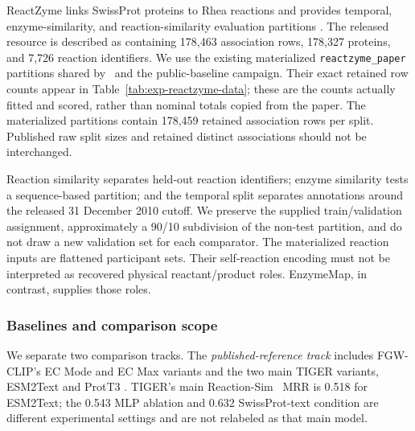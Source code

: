 ReactZyme links SwissProt proteins to Rhea reactions and provides temporal,
enzyme-similarity, and reaction-similarity evaluation partitions
\citep{hua2024reactzyme}. The released resource is described as containing
178,463 association rows, 178,327 proteins, and 7,726 reaction identifiers.
We use the existing materialized \texttt{reactzyme\_paper} partitions shared
by \methodname\ and the public-baseline campaign. Their exact retained row
counts appear in Table~\ref{tab:exp-reactzyme-data}; these are the counts
actually fitted and scored, rather than nominal totals copied from the paper.
The materialized partitions contain 178,459 retained association rows per
split. Published raw split sizes and retained distinct associations should
not be interchanged.

Reaction similarity separates held-out reaction identifiers; enzyme similarity
tests a sequence-based partition; and the temporal split separates annotations
around the released 31 December 2010 cutoff. We preserve the supplied
train/validation assignment, approximately a 90/10 subdivision of the
non-test partition, and do not draw a new validation set for each comparator.
The materialized reaction inputs are flattened participant sets. Their
self-reaction encoding must not be interpreted as recovered physical
reactant/product roles. EnzymeMap, in contrast, supplies those roles.

\begin{table}[htbp]
\centering\small
\caption{Audited ReactZyme materialization. Train, validation, and test columns
count retained association rows. The last two columns give the complete test
reaction and enzyme catalogs: their roles as query and candidate sets swap
between retrieval directions. Every locally retrained comparator uses these
same catalogs and their recorded ordering.}
\label{tab:exp-reactzyme-data}
\resizebox{\linewidth}{!}{}
\end{table}

\subsubsection{Baselines and comparison scope}

We separate two comparison tracks. The \emph{published-reference track}
includes FGW-CLIP's EC Mode and EC Max variants and the two main TIGER
variants, ESM2Text and ProtT3 \citep{zhou2026fgwclip,zhang2026tiger}. TIGER's
main Reaction-Sim \expEtoR\ MRR is 0.518 for ESM2Text; the 0.543 MLP ablation
and 0.632 SwissProt-text condition are different experimental settings and
are not relabeled as that main model.

